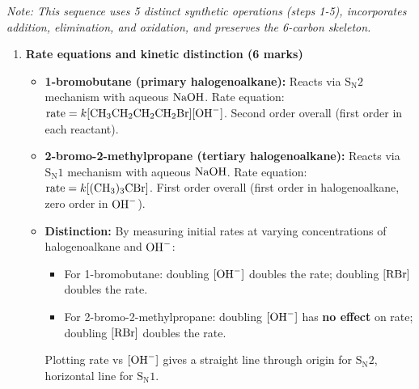 \documentclass[11pt]{article}
\begin{document}
\begin{corrige}
\begin{enumerate}
\textit{Note: This sequence uses 5 distinct synthetic operations (steps 1-5), incorporates addition, elimination, and oxidation, and preserves the 6-carbon skeleton.}

\end{enumerate}
\end{corrige}

\begin{corrige}
\begin{enumerate}
\item \textbf{Rate equations and kinetic distinction (6 marks)}
   \begin{itemize}
   \item \textbf{1-bromobutane (primary halogenoalkane):} Reacts via \(\mathrm{S_N2}\) mechanism with aqueous \(\ce{NaOH}\).
         Rate equation: \(\text{rate} = k[\ce{CH3CH2CH2CH2Br}][\ce{OH-}]\). Second order overall (first order in each reactant).
   \item \textbf{2-bromo-2-methylpropane (tertiary halogenoalkane):} Reacts via \(\mathrm{S_N1}\) mechanism with aqueous \(\ce{NaOH}\).
         Rate equation: \(\text{rate} = k[\ce{(CH3)3CBr}]\). First order overall (first order in halogenoalkane, zero order in \(\ce{OH-}\)).
   \item \textbf{Distinction:} By measuring initial rates at varying concentrations of halogenoalkane and \(\ce{OH-}\):
         \begin{itemize}
         \item For 1-bromobutane: doubling \([\ce{OH-}]\) doubles the rate; doubling \([\ce{RBr}]\) doubles the rate.
         \item For 2-bromo-2-methylpropane: doubling \([\ce{OH-}]\) has \textbf{no effect} on rate; doubling \([\ce{RBr}]\) doubles the rate.
         \end{itemize}
         Plotting rate vs \([\ce{OH-}]\) gives a straight line through origin for \(\mathrm{S_N2}\), horizontal line for \(\mathrm{S_N1}\).
   \end{itemize}


\end{enumerate}
\end{corrige}
\end{document}

